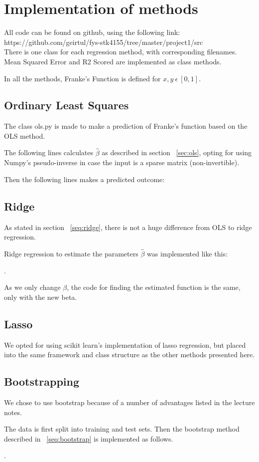 \section{Implementation of methods}
All code can be found on github, using the following link:\\ 
https://github.com/geirtul/fys-stk4155/tree/master/project1/src\\

There is one class for each regression method, with corresponding 
filenames. Mean Squared Error and R2 Scored are implemented as class methods.

In all the methods, Franke's Function is defined for 
\(x,y \ \epsilon \ [0,1]\).

\subsection{Ordinary Least Squares}
The class ols.py is made to make a prediction of Franke's function
based on the OLS method. 

The following lines calculates \(\hat{\beta}\) as described in 
section ~\ref{sec:ols}, opting for using Numpy's pseudo-inverse in case
the input is a sparse matrix (non-invertible).



Then the following lines makes a predicted outcome:



\subsection{Ridge}
As stated in section ~\ref{seq:ridge}, there is 
not a huge difference from OLS to ridge regression. 

Ridge regression to estimate the parameters \(\hat{\beta}\)
was implemented like this:

.

As we only change \(\beta\), the code for finding the estimated function 
is the same, only with the new beta. 

\subsection{Lasso}
We opted for using scikit learn's implementation of lasso regression, but placed
into the same framework and class structure as the other methods presented here.

\subsection{Bootstrapping} 
We chose to use bootstrap because of a number of advantages listed in the 
lecture notes. ~\cite{LectureNotes-FysStk}

The data is first split into training and test sets. 
Then the bootstrap method described in ~\ref{seq:bootstrap} is 
implemented as follows.

.
~\cite{BiasAndVariance}


